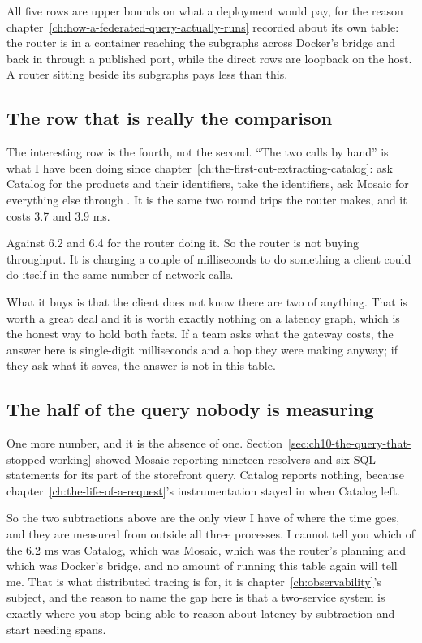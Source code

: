 %
All five rows are upper bounds on what a deployment would pay, for the reason
chapter~\ref{ch:how-a-federated-query-actually-runs} recorded about its own
table: the router is in a container reaching the subgraphs across Docker's
bridge and back in through a published port, while the direct rows are loopback
on the host. A router sitting beside its subgraphs pays less than this.

\subsection*{The row that is really the comparison}

%
The interesting row is the fourth, not the second. \enquote{The two calls by
hand} is what I have been doing since
chapter~\ref{ch:the-first-cut-extracting-catalog}: ask Catalog for the products
and their identifiers, take the identifiers, ask Mosaic for everything else
through . It is the same two round trips the router makes, and
it costs 3.7 and 3.9 ms.

Against 6.2 and 6.4 for the router doing it. So the router is not buying
throughput. It is charging a couple of milliseconds to do something a client
could do itself in the same number of network calls.

What it buys is that the client does not know there are two of anything. That is
worth a great deal and it is worth exactly nothing on a latency graph, which is
the honest way to hold both facts. If a team asks what the gateway costs, the
answer here is single-digit milliseconds and a hop they were making anyway; if
they ask what it saves, the answer is not in this table.

\subsection*{The half of the query nobody is measuring}

%
One more number, and it is the absence of one.
Section~\ref{sec:ch10-the-query-that-stopped-working} showed Mosaic reporting
nineteen resolvers and six SQL statements for its part of the storefront query.
Catalog reports nothing, because chapter~\ref{ch:the-life-of-a-request}'s
instrumentation stayed in  when Catalog left.

So the two subtractions above are the only view I have of where the time goes,
and they are measured from outside all three processes. I cannot tell you which
of the 6.2 ms was Catalog, which was Mosaic, which was the router's planning and
which was Docker's bridge, and no amount of running this table again will tell
me. That is what distributed tracing is for, it is
chapter~\ref{ch:observability}'s subject, and the reason to name the gap here is
that a two-service system is exactly where you stop being able to reason about
latency by subtraction and start needing spans.

%
